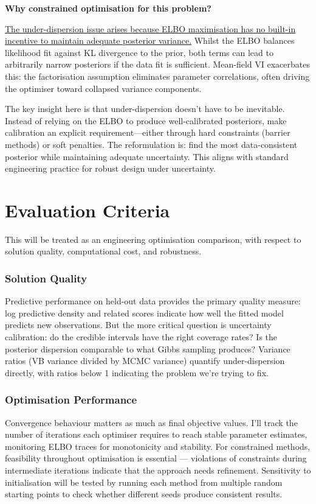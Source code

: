 \documentclass[11pt,a4paper]{article}
\begin{document}
\textbf{Why constrained optimisation for this problem?}

\uline{The under-dispersion issue arises because ELBO maximisation has no built-in incentive to maintain adequate posterior variance.} Whilst the ELBO balances likelihood fit against KL divergence to the prior, both terms can lead to arbitrarily narrow posteriors if the data fit is sufficient. Mean-field VI exacerbates this: the factorisation assumption eliminates parameter correlations, often driving the optimiser toward collapsed variance components.

The key insight here is that under-dispersion doesn't have to be inevitable. Instead of relying on the ELBO to produce well-calibrated posteriors, make calibration an explicit requirement—either through hard constraints (barrier methods) or soft penalties. The reformulation is: find the most data-consistent posterior while maintaining adequate uncertainty. This aligns with standard engineering practice for robust design under uncertainty.

\section{Evaluation Criteria}

This will be treated as an engineering optimisation comparison, with respect to solution quality, computational cost, and robustness.

\subsubsection*{Solution Quality}

Predictive performance on held-out data provides the primary quality measure: log predictive density and related scores indicate how well the fitted model predicts new observations. But the more critical question is uncertainty calibration: do the credible intervals have the right coverage rates? Is the posterior dispersion comparable to what Gibbs sampling produces? Variance ratios (VB variance divided by MCMC variance) quantify under-dispersion directly, with ratios below 1 indicating the problem we're trying to fix.

\subsubsection*{Optimisation Performance}

Convergence behaviour matters as much as final objective values. I'll track the number of iterations each optimiser requires to reach stable parameter estimates, monitoring ELBO traces for monotonicity and stability. For constrained methods, feasibility throughout optimisation is essential — violations of constraints during intermediate iterations indicate that the approach needs refinement. Sensitivity to initialisation will be tested by running each method from multiple random starting points to check whether different seeds produce consistent results.
\end{document}
